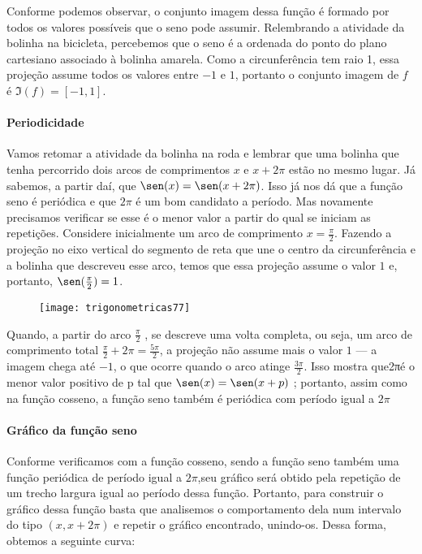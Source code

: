 Conforme podemos observar, o conjunto imagem dessa função é formado por todos os valores possíveis que o seno pode assumir. Relembrando a atividade da bolinha na bicicleta, percebemos que o seno é a ordenada do ponto do plano cartesiano associado à bolinha amarela. Como a circunferência tem raio 1, essa projeção assume todos os valores entre $-1$ e $1$, portanto o conjunto imagem de $f$ é  $\Im(f)=[-1,1]$.

\paragraph{Periodicidade}

Vamos retomar a atividade da bolinha na roda e lembrar que uma bolinha que tenha percorrido dois arcos de comprimentos $x$ e $x+2\pi$ estão no mesmo lugar. Já sabemos, a partir daí, que $\sen(x)=\sen(x+2\pi)$. Isso já nos dá que a função seno é periódica e que $2\pi$ é um bom candidato a período. Mas novamente precisamos verificar se esse é o menor valor a partir do qual se iniciam as repetições. Considere inicialmente um arco de comprimento $x=\frac{\pi}{2}$. Fazendo a projeção no eixo vertical do segmento de reta que une o centro da circunferência e a bolinha que descreveu esse arco, temos que essa projeção assume o valor $1$ e, portanto, $\sen(\frac{\pi}{2})=1$.

\begin{figure}[H]
\centering

\texttt{[image: trigonometricas77]}
\end{figure}

Quando, a partir do arco $\frac{\pi}{2}$ , se descreve uma volta completa, ou seja, um arco de comprimento total  $\frac{\pi}{2}+2\pi=\frac{5\pi}{2}$, a projeção não assume mais o valor $1$ --- a imagem chega até $-1$, o que ocorre quando o arco atinge $\frac{3\pi}{2}$. Isso mostra que2πé o menor valor positivo de p tal que $\sen(x)=\sen(x+p)$ ; portanto, assim como na função cosseno, a função seno também é periódica com período igual a $2\pi$

\paragraph{Gráfico da função seno}

Conforme verificamos com a função cosseno, sendo a função seno também uma função periódica de período igual a $2\pi$,seu gráfico será obtido pela repetição de um trecho largura igual ao período dessa função. Portanto, para construir o gráfico dessa função basta que analisemos o comportamento dela num intervalo do tipo $(x, x+2π)$ e repetir o gráfico encontrado, unindo-os. Dessa forma, obtemos a seguinte curva:

